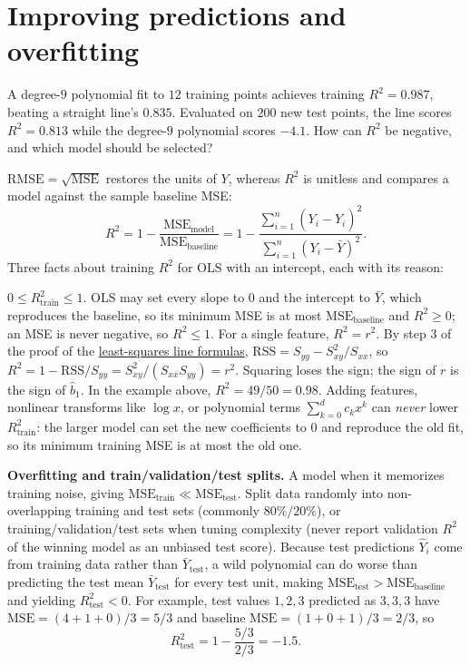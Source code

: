 \documentclass[10pt]{scrartcl}
\begin{document}
\section{Improving predictions and overfitting}

\begin{qbox}
  A degree-$9$ polynomial fit to $12$ training points achieves training $R^2 = 0.987$, beating a straight line's $0.835$. Evaluated on $200$ new test points, the line scores $R^2 = 0.813$ while the degree-$9$ polynomial scores $-4.1$. How can $R^2$ be negative, and which model should be selected?
\end{qbox}

$\mathrm{RMSE} = \sqrt{\mathrm{MSE}}$ restores the units of $Y$, whereas $R^2$ is unitless and compares a model against the sample baseline MSE:
\[
  R^2 = 1 - \frac{\mathrm{MSE}_{\text{model}}}{\mathrm{MSE}_{\text{baseline}}} = 1 - \frac{\sum_{i=1}^n (Y_i - \hat Y_i)^2}{\sum_{i=1}^n (Y_i - \bar Y)^2}.
\]
Three facts about training $R^2$ for OLS with an intercept, each with its reason:
\begin{itemize}
  \ii $0 \le R^2_{\text{train}} \le 1$. OLS may set every slope to $0$ and the intercept to $\bar Y$, which reproduces the baseline, so its minimum MSE is at most $\mathrm{MSE}_{\text{baseline}}$ and $R^2 \ge 0$; an MSE is never negative, so $R^2 \le 1$.
  \ii For a single feature, $R^2 = r^2$. By step 3 of the proof of the \hyperref[thm-ols-line]{least-squares line formulas}, $\mathrm{RSS} = S_{yy} - S_{xy}^2/S_{xx}$, so $R^2 = 1 - \mathrm{RSS}/S_{yy} = S_{xy}^2/(S_{xx}S_{yy}) = r^2$. Squaring loses the sign; the sign of $r$ is the sign of $\hat b_1$. In the example above, $R^2 = 49/50 = 0.98$.
  \ii Adding features, nonlinear transforms like $\log x$, or polynomial terms $\sum_{k=0}^d c_k x^k$ can \emph{never} lower $R^2_{\text{train}}$: the larger model can set the new coefficients to $0$ and reproduce the old fit, so its minimum training MSE is at most the old one.
\end{itemize}

\medskip\noindent\textbf{Overfitting and train/validation/test splits.} A model  when it memorizes training noise, giving $\mathrm{MSE}_{\text{train}} \ll \mathrm{MSE}_{\text{test}}$. Split data randomly into non-overlapping training and test sets (commonly $80\% / 20\%$), or training/validation/test sets when tuning complexity (never report validation $R^2$ of the winning model as an unbiased test score). Because test predictions $\hat Y_i$ come from training data rather than $\bar Y_{\text{test}}$, a wild polynomial can do worse than predicting the test mean $\bar Y_{\text{test}}$ for every test unit, making $\mathrm{MSE}_{\text{test}} > \mathrm{MSE}_{\text{baseline}}$ and yielding $R^2_{\text{test}} < 0$. For example, test values $1,2,3$ predicted as $3,3,3$ have $\mathrm{MSE} = (4+1+0)/3 = 5/3$ and baseline $\mathrm{MSE} = (1+0+1)/3 = 2/3$, so
\[
  R^2_{\text{test}} = 1 - \frac{5/3}{2/3} = -1.5 .
\]
\end{document}
